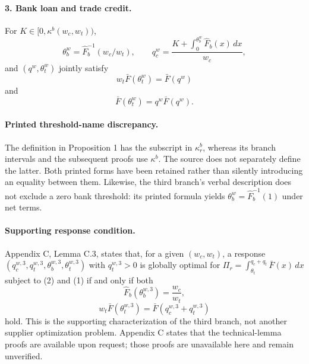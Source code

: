 \documentclass{article}
\begin{document}
\paragraph{3. Bank loan and trade credit.}
For $K\in[0,\kappa^b(w_c,w_t))$,
\[
\theta_b^w=\hat F_b^{-1}(w_c/w_t),\qquad
q_c^w=\frac{K+\displaystyle\int_0^{\theta_b^w}\hat F_b(x)\,dx}{w_c},
\]
and $(q^w,\theta_t^w)$ jointly satisfy
\[
w_t\bar F(\theta_t^w)=\bar F(q^w)
\]
and
\begin{equation}
[\theta_t^w+C(\theta_b^w)]\bar F(\theta_t^w)
=q^w\bar F(q^w).\tag{6}
\end{equation}

\paragraph{Printed threshold-name discrepancy.}
The definition in Proposition 1 has the subscript in $\kappa_r^b$, whereas its branch intervals and the subsequent proofs use $\kappa^b$. The source does not separately define the latter. Both printed forms have been retained rather than silently introducing an equality between them. Likewise, the third branch's verbal description does not exclude a zero bank threshold: its printed formula yields $\theta_b^w=\hat F_b^{-1}(1)$ under net terms.

\paragraph{Supporting response condition.}
Appendix C, Lemma C.3, states that, for a given $(w_c,w_t)$, a response $(q_c^{w,3},q_t^{w,3},\theta_b^{w,3},\theta_t^{w,3})$ with $q_t^{w,3}>0$ is globally optimal for
$\Pi_r=\int_{\theta_t}^{q_c+q_t}\bar F(x)\,dx$ subject to (2) and (1) if and only if both
\begin{equation}
\hat F_b(\theta_b^{w,3})=\frac{w_c}{w_t},\tag{69}
\end{equation}
\begin{equation}
w_t\bar F(\theta_t^{w,3})=\bar F(q_c^{w,3}+q_t^{w,3})\tag{70}
\end{equation}
hold. This is the supporting characterization of the third branch, not another supplier optimization problem. Appendix C states that the technical-lemma proofs are available upon request; those proofs are unavailable here and remain unverified.
\end{document}
